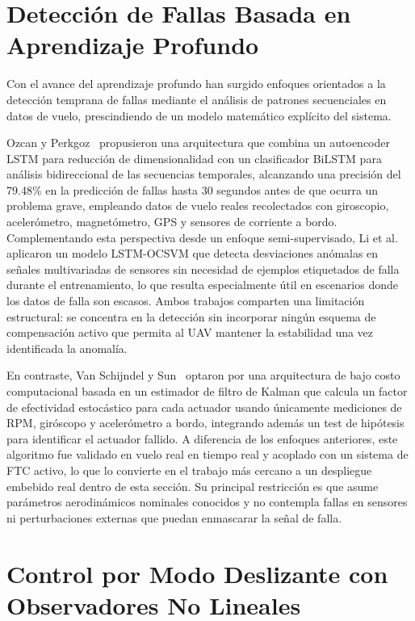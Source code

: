 \section{Detección de Fallas Basada en Aprendizaje Profundo}

Con el avance del aprendizaje profundo han surgido enfoques orientados a la detección temprana de fallas mediante el análisis de patrones secuenciales en datos de vuelo, prescindiendo de un modelo matemático explícito del sistema.

Ozcan y Perkgoz~\cite{ozcan2024} propusieron una arquitectura que combina un autoencoder LSTM para reducción de dimensionalidad con un clasificador BiLSTM para análisis bidireccional de las secuencias temporales, alcanzando una precisión del 79.48\% en la predicción de fallas hasta 30 segundos antes de que ocurra un problema grave, empleando datos de vuelo reales recolectados con giroscopio, acelerómetro, magnetómetro, GPS y sensores de corriente a bordo. Complementando esta perspectiva desde un enfoque semi-supervisado, Li et al.~\cite{li2021} aplicaron un modelo LSTM-OCSVM que detecta desviaciones anómalas en señales multivariadas de sensores sin necesidad de ejemplos etiquetados de falla durante el entrenamiento, lo que resulta especialmente útil en escenarios donde los datos de falla son escasos. Ambos trabajos comparten una limitación estructural: se concentra en la detección sin incorporar ningún esquema de compensación activo que permita al UAV mantener la estabilidad una vez identificada la anomalía.

En contraste, Van Schijndel y Sun~\cite{schijndel2021} optaron por una arquitectura de bajo costo computacional basada en un estimador de filtro de Kalman que calcula un factor de efectividad estocástico para cada actuador usando únicamente mediciones de RPM, giróscopo y acelerómetro a bordo, integrando además un test de hipótesis para identificar el actuador fallido. A diferencia de los enfoques anteriores, este algoritmo fue validado en vuelo real en tiempo real y acoplado con un sistema de FTC activo, lo que lo convierte en el trabajo más cercano a un despliegue embebido real dentro de esta sección. Su principal restricción es que asume parámetros aerodinámicos nominales conocidos y no contempla fallas en sensores ni perturbaciones externas que puedan enmascarar la señal de falla.


\section{Control por Modo Deslizante con Observadores No Lineales}


